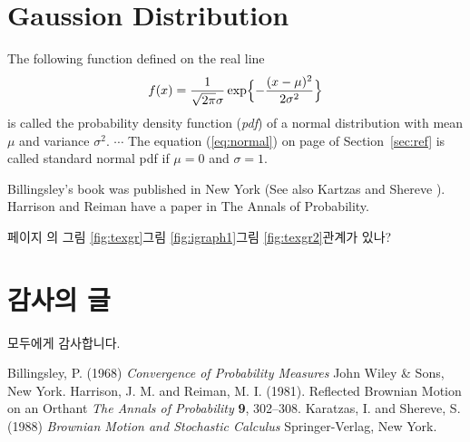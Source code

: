 \documentclass[11pt]{article}
\begin{document}
\tableofcontents
\listoffigures
\listoftables

\section{Gaussion Distribution \label{sec:ref}} 
The following function defined on the real line
\begin{equation} \label{eq:normal}
f(x) = \frac{1}{\sqrt{2\pi}\sigma} \exp\Bigl\{-\frac{(x-\mu)^2}{2\sigma^2}\Bigr\}
\end{equation}
is called the probability density function (\emph{pdf}) of a normal distribution with mean $\mu$ and variance $\sigma^2$. $\cdots$ The equation (\eqref{eq:normal}) on page \pageref{eq:normal} of Section~\ref{sec:ref} is called standard normal pdf if $\mu=0$ and $\sigma=1$.

Billingsley's \cite[see Chapter~5]{bill1} book was published in New York (See also Kartzas and Shereve \cite[Optional]{KandS}). Harrison and Reiman \cite{HandR} have a paper in The Annals of Probability.

페이지 \pageref{fig:texgr}\와 \pageref{fig:igraph1}의 그림 \ref{fig:texgr}\과 그림 \ref{fig:igraph1}\는 그림 \ref{fig:texgr2}\와 관계가 있나?

\section*{감사의 글}
모두에게 감사합니다.

\begin{thebibliography}{12345}
 Billingsley, P. (1968) \emph{Convergence of Probability Measures} John Wiley \& Sons, New York.
 Harrison, J. M. and Reiman, M. I. (1981). Reflected Brownian Motion on an Orthant \emph{The Annals of Probability} \textbf{9}, 302--308.
 Karatzas, I. and Shereve, S. (1988) \emph{Brownian Motion and Stochastic Calculus} Springer-Verlag, New York.
\end{thebibliography}
\end{document}
